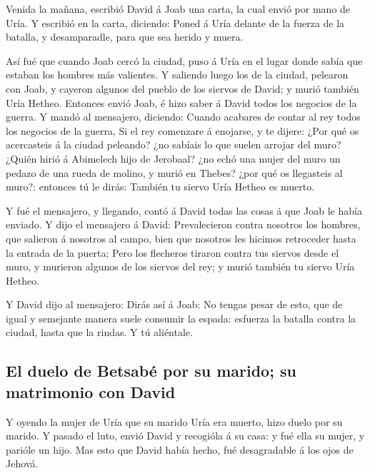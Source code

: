  Venida la mañana, escribió David á Joab una carta, la cual
envió por mano de Uría.  Y escribió en la carta, diciendo:
Poned á Uría delante de la fuerza de la batalla, y desamparadle, para
que sea herido y muera.

 Así fué que cuando Joab cercó la ciudad, puso á Uría en el
lugar donde sabía que estaban los hombres más valientes.  Y
saliendo luego los de la ciudad, pelearon con Joab, y cayeron algunos
del pueblo de los siervos de David; y murió también Uría Hetheo.
 Entonces envió Joab, é hizo saber á David todos los
negocios de la guerra.  Y mandó al mensajero, diciendo:
Cuando acabares de contar al rey todos los negocios de la guerra,
 Si el rey comenzare á enojarse, y te dijere: ¿Por qué os
acercasteis á la ciudad peleando? ¿no sabíais lo que suelen arrojar del
muro?  ¿Quién hirió á Abimelech hijo de Jerobaal? ¿no echó
una mujer del muro un pedazo de una rueda de molino, y murió en Thebes?
¿por qué os llegasteis al muro?: entonces tú le dirás: También tu siervo
Uría Hetheo es muerto.

 Y fué el mensajero, y llegando, contó á David todas las
cosas á que Joab le había enviado.  Y dijo el mensajero á
David: Prevalecieron contra nosotros los hombres, que salieron á
nosotros al campo, bien que nosotros les hicimos retroceder hasta la
entrada de la puerta;  Pero los flecheros tiraron contra
tus siervos desde el muro, y murieron algunos de los siervos del rey; y
murió también tu siervo Uría Hetheo.

 Y David dijo al mensajero: Dirás así á Joab: No tengas
pesar de esto, que de igual y semejante manera suele consumir la espada:
esfuerza la batalla contra la ciudad, hasta que la rindas. Y tú
aliéntale.

\hypertarget{el-duelo-de-betsabuxe9-por-su-marido-su-matrimonio-con-david}{%
\subsection{El duelo de Betsabé por su marido; su matrimonio con
David}\label{el-duelo-de-betsabuxe9-por-su-marido-su-matrimonio-con-david}}

 Y oyendo la mujer de Uría que su marido Uría era muerto,
hizo duelo por su marido.  Y pasado el luto, envió David y
recogióla á su casa: y fué ella su mujer, y parióle un hijo. Mas esto
que David había hecho, fué desagradable á los ojos de Jehová.

